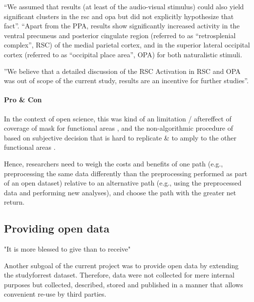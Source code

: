 %
``We assumed that results (at least of the audio-visual stimulus) could also
yield significant clusters in the \ac{rsc} and \ac{opa} but did not explicitly
hypothesize that fact''.
%
``Apart from the PPA, results show significantly increased activity in the
ventral precuneus and posterior cingulate region (referred to as ``retrosplenial
complex'', RSC) of the medial parietal cortex, and in the superior lateral
occipital cortex (referred to as ``occipital place area'', OPA) for both
naturalistic stimuli.

%
''We believe that a detailed discussion of the RSC Activation in RSC and OPA was
out of scope of the current study, results are an incentive for further
studies''.


\paragraph{Pro \& Con}


%
In the context of open science, this was kind of an limitation / aftereffect of
coverage of mask for functional areas \citet{sengupta2016extension}, and the
non-algorithmic procedure of \citet{sengupta2016extension} based on subjective
decision that is hard to replicate \& to amply to the other functional areas
\citep[cf. algorithmic procedure in, e.g.,][]{julian2012algorithmic}.

Hence, researchers need to weigh the costs and benefits of one path (e.g.,
preprocessing the same data differently than the preprocessing performed as part
of an open dataset) relative to an alternative path (e.g., using the
preprocessed data and performing new analyses), and choose the path with the
greater net return.



\subsection{Providing open data}

"It is more blessed to give than to receive"

%
Another subgoal of the current project was to provide open data by extending the
studyforrest dataset.
%
Therefore, data were not collected for mere internal purposes but collected,
described, stored and published in a manner that allows convenient re-use by
third parties.


